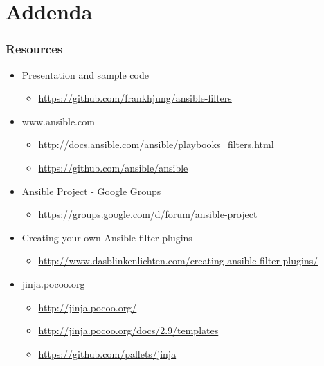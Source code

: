\documentclass[pdf]{beamer}
\begin{document}
\section{Addenda}

\begin{frame}
  \frametitle{Resources}
  \begin{itemize}
    \item[] Presentation and sample code
      \begin{itemize}
        \item \scriptsize \url{https://github.com/frankhjung/ansible-filters}
      \end{itemize}
    \item[] www.ansible.com
      \begin{itemize}
        \item \scriptsize \url{http://docs.ansible.com/ansible/playbooks_filters.html}
        \item \scriptsize \url{https://github.com/ansible/ansible}
      \end{itemize}
    \item[] Ansible Project - Google Groups
      \begin{itemize}
        \item \scriptsize \url{https://groups.google.com/d/forum/ansible-project}
      \end{itemize}
    \item[] Creating your own Ansible filter plugins
      \begin{itemize}
        \item \scriptsize \url{http://www.dasblinkenlichten.com/creating-ansible-filter-plugins/}
      \end{itemize}
    \item[] jinja.pocoo.org
      \begin{itemize}
        \item \scriptsize \url{http://jinja.pocoo.org/}
        \item \scriptsize \url{http://jinja.pocoo.org/docs/2.9/templates}
        \item \scriptsize \url{https://github.com/pallets/jinja}
      \end{itemize}
  \end{itemize}
\end{frame}
\end{document}
